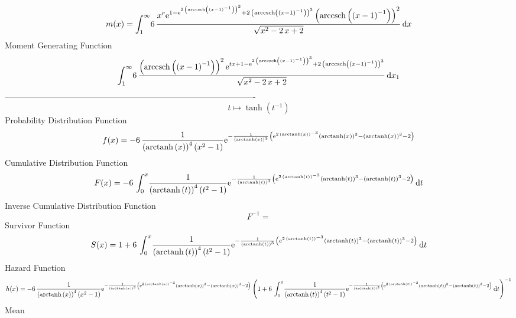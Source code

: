 \documentclass[12pt]{article}
\begin{document}
 $$ m(x) = \int_{1}^{\infty }\!6\,{\frac {{x}^{r}{{\rm e}^{1-{{\rm e}^{2\,
 \left( {\rm arccsch} \left( \left( x-1 \right) ^{-1}\right) \right) ^
{3}}}+2\, \left( {\rm arccsch} \left( \left( x-1 \right) ^{-1}\right)
 \right) ^{3}}} \left( {\rm arccsch} \left( \left( x-1 \right) ^{-1}
\right) \right) ^{2}}{\sqrt {{x}^{2}-2\,x+2}}}\,{\rm d}x
$$ Moment Generating Function 
 $$\int_{1}^{\infty }\!6\,{\frac { \left( {\rm arccsch} \left( \left( x-1
 \right) ^{-1}\right) \right) ^{2}{{\rm e}^{tx+1-{{\rm e}^{2\, \left( 
{\rm arccsch} \left( \left( x-1 \right) ^{-1}\right) \right) ^{3}}}+2
\, \left( {\rm arccsch} \left( \left( x-1 \right) ^{-1}\right)
 \right) ^{3}}}}{\sqrt {{x}^{2}-2\,x+2}}}\,{\rm d}x_{{1}}
$$-------------------------------------------------------------------------------------------  \\$$t\mapsto \tanh \left( {t}^{-1} \right) 
$$Probability Distribution Function 
$$  f(x)=-6\,{\frac {1}{ \left( {\rm arctanh} \left(x\right) \right) ^{4}
 \left( {x}^{2}-1 \right) }{{\rm e}^{-{\frac {1}{ \left( {\rm arctanh}
 \left(x\right) \right) ^{3}} \left( {{\rm e}^{2\, \left( 
{\rm arctanh} \left(x\right) \right) ^{-3}}} \left( {\rm arctanh} 
\left(x\right) \right) ^{3}- \left( {\rm arctanh} \left(x\right)
 \right) ^{3}-2 \right) }}}}
$$Cumulative Distribution Function  
 $$F(x)=-6\,\int_{0}^{x}\!{\frac {1}{ \left( {\rm arctanh} \left(t\right)
 \right) ^{4} \left( {t}^{2}-1 \right) }{{\rm e}^{-{\frac {1}{ \left( 
{\rm arctanh} \left(t\right) \right) ^{3}} \left( {{\rm e}^{2\,
 \left( {\rm arctanh} \left(t\right) \right) ^{-3}}} \left( 
{\rm arctanh} \left(t\right) \right) ^{3}- \left( {\rm arctanh} \left(
t\right) \right) ^{3}-2 \right) }}}}\,{\rm d}t
$$ Inverse Cumulative Distribution Function 
  $$F^{-1} = $$Survivor Function 
 $$ S(x)=1+6\,\int_{0}^{x}\!{\frac {1}{ \left( {\rm arctanh} \left(t\right)
 \right) ^{4} \left( {t}^{2}-1 \right) }{{\rm e}^{-{\frac {1}{ \left( 
{\rm arctanh} \left(t\right) \right) ^{3}} \left( {{\rm e}^{2\,
 \left( {\rm arctanh} \left(t\right) \right) ^{-3}}} \left( 
{\rm arctanh} \left(t\right) \right) ^{3}- \left( {\rm arctanh} \left(
t\right) \right) ^{3}-2 \right) }}}}\,{\rm d}t
$$ Hazard Function 
 $$ h(x)=-6\,{\frac {1}{ \left( {\rm arctanh} \left(x\right) \right) ^{4}
 \left( {x}^{2}-1 \right) }{{\rm e}^{-{\frac {1}{ \left( {\rm arctanh}
 \left(x\right) \right) ^{3}} \left( {{\rm e}^{2\, \left( 
{\rm arctanh} \left(x\right) \right) ^{-3}}} \left( {\rm arctanh} 
\left(x\right) \right) ^{3}- \left( {\rm arctanh} \left(x\right)
 \right) ^{3}-2 \right) }}} \left( 1+6\,\int_{0}^{x}\!{\frac {1}{
 \left( {\rm arctanh} \left(t\right) \right) ^{4} \left( {t}^{2}-1
 \right) }{{\rm e}^{-{\frac {1}{ \left( {\rm arctanh} \left(t\right)
 \right) ^{3}} \left( {{\rm e}^{2\, \left( {\rm arctanh} \left(t
\right) \right) ^{-3}}} \left( {\rm arctanh} \left(t\right) \right) ^{
3}- \left( {\rm arctanh} \left(t\right) \right) ^{3}-2 \right) }}}}
\,{\rm d}t \right) ^{-1}}
$$Mean 
\end{document}
